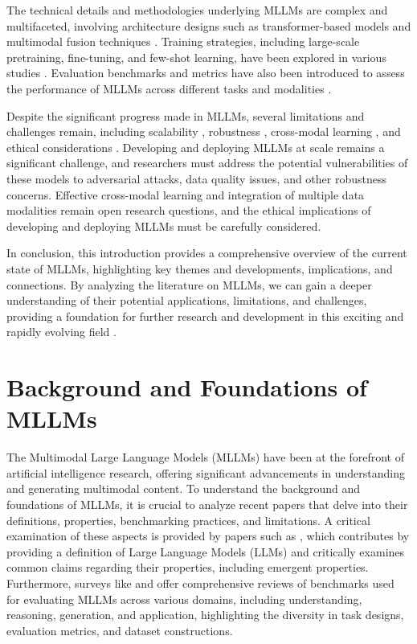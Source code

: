 \documentclass[conference]{IEEEtran}
\begin{document}
The technical details and methodologies underlying MLLMs are complex and multifaceted, involving architecture designs such as transformer-based models and multimodal fusion techniques \cite{b17}. Training strategies, including large-scale pretraining, fine-tuning, and few-shot learning, have been explored in various studies \cite{b18, b19}. Evaluation benchmarks and metrics have also been introduced to assess the performance of MLLMs across different tasks and modalities \cite{b20}.

Despite the significant progress made in MLLMs, several limitations and challenges remain, including scalability \cite{b21}, robustness \cite{b22}, cross-modal learning \cite{b23}, and ethical considerations \cite{b24}. Developing and deploying MLLMs at scale remains a significant challenge, and researchers must address the potential vulnerabilities of these models to adversarial attacks, data quality issues, and other robustness concerns. Effective cross-modal learning and integration of multiple data modalities remain open research questions, and the ethical implications of developing and deploying MLLMs must be carefully considered.

In conclusion, this introduction provides a comprehensive overview of the current state of MLLMs, highlighting key themes and developments, implications, and connections. By analyzing the literature on MLLMs, we can gain a deeper understanding of their potential applications, limitations, and challenges, providing a foundation for further research and development in this exciting and rapidly evolving field \cite{b25}.

\section{Background and Foundations of MLLMs}
The Multimodal Large Language Models (MLLMs) have been at the forefront of artificial intelligence research, offering significant advancements in understanding and generating multimodal content. To understand the background and foundations of MLLMs, it is crucial to analyze recent papers that delve into their definitions, properties, benchmarking practices, and limitations. A critical examination of these aspects is provided by papers such as \cite{b1}, which contributes by providing a definition of Large Language Models (LLMs) and critically examines common claims regarding their properties, including emergent properties. Furthermore, surveys like \cite{b2} and \cite{b3} offer comprehensive reviews of benchmarks used for evaluating MLLMs across various domains, including understanding, reasoning, generation, and application, highlighting the diversity in task designs, evaluation metrics, and dataset constructions.
\end{document}
